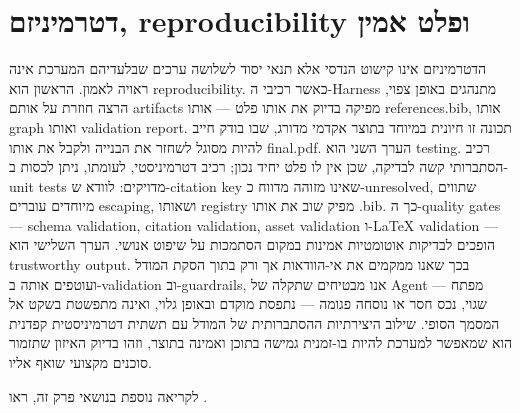 \section{דטרמיניזם, reproducibility ופלט אמין}
הדטרמיניזם אינו קישוט הנדסי אלא תנאי יסוד לשלושה ערכים שבלעדיהם המערכת אינה ראויה לאמון. הראשון הוא reproducibility. כאשר רכיבי ה-Harness מתנהגים באופן צפוי, הרצה חוזרת על אותם artifacts מפיקה בדיוק את אותו פלט — אותו references.bib, אותו graph ואותו validation report. תכונה זו חיונית במיוחד בתוצר אקדמי מדורג, שבו בודק חייב להיות מסוגל לשחזר את הבנייה ולקבל את אותו final.pdf. הערך השני הוא testing. רכיב הסתברותי קשה לבדיקה, שכן אין לו פלט יחיד נכון; רכיב דטרמיניסטי, לעומתו, ניתן לכסות ב-unit tests מדויקים: לוודא ש-citation key שאינו מזוהה מדווח כ-unresolved, שתווים מיוחדים עוברים escaping, ושאותו registry מפיק שוב את אותו .bib. כך ה-quality gates — schema validation, citation validation, asset validation ו-LaTeX validation — הופכים לבדיקות אוטומטיות אמינות במקום הסתמכות על שיפוט אנושי. הערך השלישי הוא trustworthy output. בכך שאנו ממקמים את אי-הוודאות אך ורק בתוך הסקת המודל ועוטפים אותה ב-validation וב-guardrails, אנו מבטיחים שתקלה של Agent — מפתח שגוי, נכס חסר או נוסחה פגומה — נתפסת מוקדם ובאופן גלוי, ואינה מתפשטת בשקט אל המסמך הסופי. שילוב היצירתיות ההסתברותית של המודל עם תשתית דטרמיניסטית קפדנית הוא שמאפשר למערכת להיות בו-זמנית גמישה בתוכן ואמינה בתוצר, וזהו בדיוק האיזון שתזמור סוכנים מקצועי שואף אליו.

לקריאה נוספת בנושאי פרק זה, ראו \cite{crewai_docs}.

